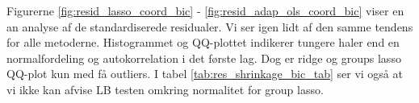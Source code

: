 

Figurerne \ref{fig:resid_lasso_coord_bic} - \ref{fig:resid_adap_ols_coord_bic} viser en an analyse af de standardiserede residualer.
Vi ser igen lidt af den samme tendens for alle metoderne. 
Histogrammet og QQ-plottet indikerer tungere haler end en normalfordeling og autokorrelation i det første lag. 
Dog er ridge og groups lasso QQ-plot kun med få outliers. 
I tabel \ref{tab:res_shrinkage_bic_tab} ser vi også at vi ikke kan afvise LB testen omkring normalitet for group lasso. 

%




